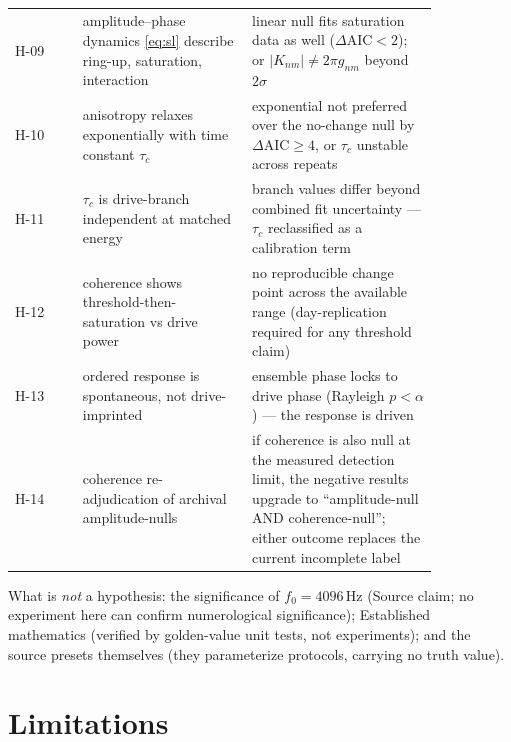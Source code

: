 \documentclass[10pt,letterpaper]{article}
\begin{document}
\begin{longtable}{@{}l p{0.40\linewidth} p{0.44\linewidth}@{}}
H-09 & amplitude--phase dynamics \eqref{eq:sl} describe ring-up,
saturation, interaction & linear null fits saturation data as well
($\Delta\mathrm{AIC} < 2$); or $|K_{nm}| \neq 2\pi g_{nm}$ beyond $2\sigma$ \\
H-10 & anisotropy relaxes exponentially with time constant $\tau_c$ &
exponential not preferred over the no-change null by
$\Delta\mathrm{AIC} \ge 4$, or $\tau_c$ unstable across repeats \\
H-11 & $\tau_c$ is drive-branch independent at matched energy & branch
values differ beyond combined fit uncertainty — $\tau_c$ reclassified as
a calibration term \\
H-12 & coherence shows threshold-then-saturation vs drive power & no
reproducible change point across the available range (day-replication
required for any threshold claim) \\
H-13 & ordered response is spontaneous, not drive-imprinted & ensemble
phase locks to drive phase (Rayleigh $p < \alpha$) — the response is
driven \\
H-14 & coherence re-adjudication of archival amplitude-nulls & if
coherence is also null at the measured detection limit, the negative
results upgrade to ``amplitude-null AND coherence-null''; either outcome
replaces the current incomplete label \\
\bottomrule
\end{longtable}

What is \emph{not} a hypothesis: the significance of $f_0 = 4096$\,Hz
(Source claim; no experiment here can confirm numerological significance);
Established mathematics (verified by golden-value unit tests, not
experiments); and the source presets themselves (they parameterize
protocols, carrying no truth value).

\section{Limitations}\label{sec:limitations}
\end{document}
